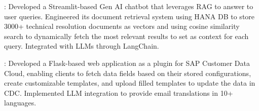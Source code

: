 
   {\projectentry
    {:} {Developed a Streamlit-based Gen AI chatbot that leverages RAG to answer to user queries. Engineered its document retrieval system using HANA DB to store 3000+ technical resolution documents as vectors and using cosine similarity search to dynamically fetch the most relevant results to set as context for each query. Integrated with LLMs through LangChain.} 
    }

    {\projectentry
    {:} {Developed a Flask-based web application as a plugin for SAP Customer Data Cloud, enabling clients to fetch data fields based on their stored configurations, create customizable templates, and upload filled templates to update the data in CDC. Implemented LLM integration to provide email translations in 10+ languages.} 
    }
    